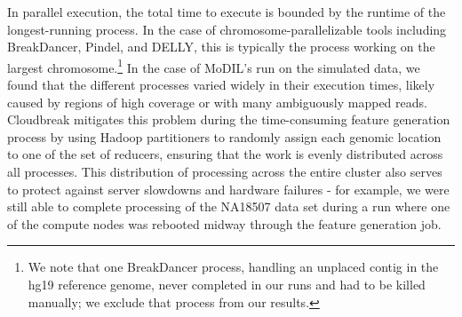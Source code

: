 \begin{table}
\begin{center}
\end{center}
\caption[Detailed runtimes for both data sets.]{Runtimes (elapsed) on both data sets of each tool tested, in single-processor and parallel mode. For parallel runs, Proc. is the maximum number of simultaneously running processes or threads. All times are in seconds. The types of variants detected by each program are listed with the abbreviations: D - deletion; I - insertion; V - Inversion; P - duplication; T - translocation. Interchromosomal translocations are only detected by BreakDancer in single CPU mode. }
\label{runtimes}
\end{table}

In parallel execution, the total time to execute is bounded by the runtime of the longest-running process. In the case of chromosome-parallelizable tools including BreakDancer, Pindel, and DELLY, this is typically the process working on the largest chromosome.\footnote{We note that one BreakDancer process, handling an unplaced contig in the hg19 reference genome, never completed in our runs and had to be killed manually; we exclude that process from our results.} In the case of MoDIL's run on the simulated data, we found that the different processes varied widely in their execution times, likely caused by regions of high coverage or with many ambiguously mapped reads. Cloudbreak mitigates this problem during the time-consuming feature generation process by using Hadoop partitioners to randomly assign each genomic location to one of the set of reducers, ensuring that the work is evenly distributed across all processes. This distribution of processing across the entire cluster also serves to protect against server slowdowns and hardware failures - for example, we were still able to complete processing of the NA18507 data set during a run where one of the compute nodes was rebooted midway through the feature generation job.

